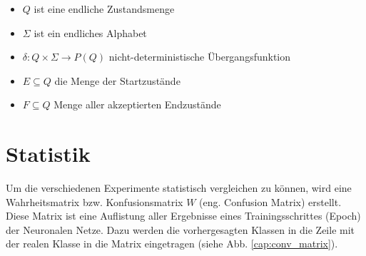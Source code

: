 \begin{itemize}
  \setlength\itemsep{-0.6em}
\item $Q$  ist eine endliche Zustandsmenge
\item $\Sigma$ ist ein endliches Alphabet
\item $\delta:Q \times \Sigma \rightarrow P(Q)$ nicht-deterministische Übergangsfunktion
\item $E \subseteq Q$ die Menge der Startzustände
\item $F \subseteq Q$ Menge aller akzeptierten Endzustände
\end{itemize}



\clearpage
\section{Statistik}\label{statistics}
Um die verschiedenen Experimente statistisch vergleichen zu können, wird eine Wahrheitsmatrix bzw. Konfusionsmatrix $W$ (eng. Confusion Matrix) erstellt. Diese Matrix ist eine Auflistung aller Ergebnisse eines Trainingsschrittes (Epoch) der Neuronalen Netze. Dazu werden die vorhergesagten Klassen in die Zeile mit der realen Klasse in die Matrix eingetragen (siehe Abb. \ref{cap:conv_matrix}).

\def\myConfMat{{
{110,  25,  30},  %
{   0, 59,  31},  %
{   5, 35,  90},  %
}}

\def\classNames{{1, 2, 3}} %

\def\numClasses{3} %

\def\myScale{1.5} %

